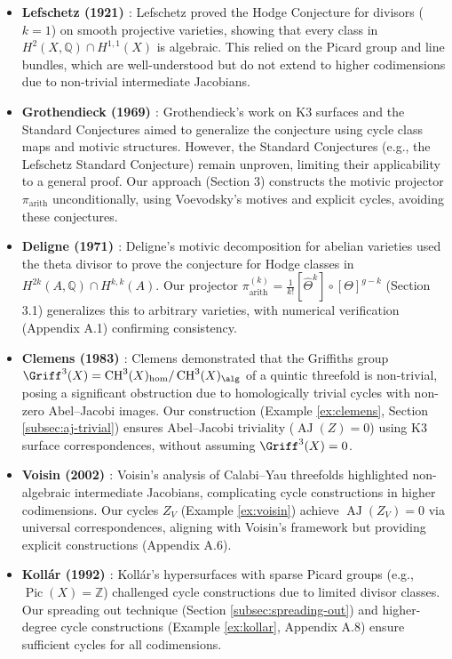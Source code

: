 \documentclass[11pt]{article}
\DeclareMathOperator{\CH}{CH}
\DeclareMathOperator{\AJ}{AJ}
\DeclareMathOperator{\Pic}{Pic}
\begin{document}
\begin{itemize}
    \item \textbf{Lefschetz (1921) \cite{lefschetz1921}}: Lefschetz proved the Hodge Conjecture for divisors (\( k=1 \)) on smooth projective varieties, showing that every class in \( H^2(X, \mathbb{Q}) \cap H^{1,1}(X) \) is algebraic. This relied on the Picard group and line bundles, which are well-understood but do not extend to higher codimensions due to non-trivial intermediate Jacobians.
    \item \textbf{Grothendieck (1969) \cite{grothendieck1969}}: Grothendieck’s work on K3 surfaces and the Standard Conjectures aimed to generalize the conjecture using cycle class maps and motivic structures. However, the Standard Conjectures (e.g., the Lefschetz Standard Conjecture) remain unproven, limiting their applicability to a general proof. Our approach (Section 3) constructs the motivic projector \(\pi_{\mathrm{arith}}\) unconditionally, using Voevodsky’s motives \cite{voevodsky2000} and explicit cycles, avoiding these conjectures.
    \item \textbf{Deligne (1971) \cite{deligne1971}}: Deligne’s motivic decomposition for abelian varieties used the theta divisor to prove the conjecture for Hodge classes in \( H^{2k}(A, \mathbb{Q}) \cap H^{k,k}(A) \). Our projector \(\pi_{\mathrm{arith}}^{(k)} = \frac{1}{k!} [\widehat{\Theta}^k] \circ [\Theta]^{g-k}\) (Section 3.1) generalizes this to arbitrary varieties, with numerical verification (Appendix A.1) confirming consistency.
    \item \textbf{Clemens (1983) \cite{clemens1983}}: Clemens demonstrated that the Griffiths group \(\Griff^3(X) = \CH^3(X)_{\hom}/\CH^3(X)_{\alg}\) of a quintic threefold is non-trivial, posing a significant obstruction due to homologically trivial cycles with non-zero Abel–Jacobi images. Our construction (Example \ref{ex:clemens}, Section \ref{subsec:aj-trivial}) ensures Abel–Jacobi triviality (\(\AJ(Z) = 0\)) using K3 surface correspondences, without assuming \(\Griff^3(X) = 0\).
    \item \textbf{Voisin (2002) \cite{voisin2002}}: Voisin’s analysis of Calabi–Yau threefolds highlighted non-algebraic intermediate Jacobians, complicating cycle constructions in higher codimensions. Our cycles \( Z_V \) (Example \ref{ex:voisin}) achieve \(\AJ(Z_V) = 0\) via universal correspondences, aligning with Voisin’s framework but providing explicit constructions (Appendix A.6).
    \item \textbf{Kollár (1992) \cite{kollar1992}}: Kollár’s hypersurfaces with sparse Picard groups (e.g., \(\Pic(X) = \mathbb{Z}\)) challenged cycle constructions due to limited divisor classes. Our spreading out technique (Section \ref{subsec:spreading-out}) and higher-degree cycle constructions (Example \ref{ex:kollar}, Appendix A.8) ensure sufficient cycles for all codimensions.
\end{itemize}
\end{document}
